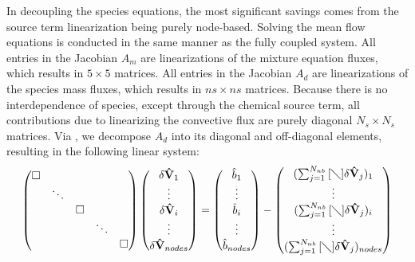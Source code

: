 In decoupling the species equations, the most significant savings comes from the
source term linearization being purely node-based\cite{gnoffo-tp}.  Solving the
mean flow equations is conducted in the same manner as the fully coupled system.
All entries in the Jacobian $A_m$ are linearizations of the mixture equation
fluxes, which results in $5\times5$ matrices. All entries in the Jacobian $A_d$
are linearizations of the species mass fluxes, which results in $ns \times ns$
matrices.  Because there is no interdependence of species, except through the
chemical source term, all contributions due to linearizing the convective flux
are purely diagonal $N_s \times N_s$ matrices.  Via , we
decompose $A_d$ into its diagonal and off-diagonal elements, resulting in the
following linear system:
\begin{equation}
  \label{dc_sys} 
  \begin{pmatrix} 
    \Box & & & & \\ & \ddots & & & \\ & & \Box \\ & & & \ddots & \\ & & & & \Box
  \end{pmatrix}
  \begin{pmatrix}
    \delta \mathbf{\hat{V}}_1 \\ \vdots \\ \delta \mathbf{\hat{V}}_i \\ 
    \vdots \\ \delta \mathbf{\hat{V}}_{nodes}
  \end{pmatrix}
  =
  \begin{pmatrix}
    \hat{b}_1 \\ \vdots \\ \hat{b}_i \\ \vdots \\ \hat{b}_{nodes} 
  \end{pmatrix}
  -
  \begin{pmatrix}
    (\sum_{j=1}^{N_{nb}}{[\diagdown] \delta\mathbf{\hat{V}}_{j}})_1 \\ \vdots \\
    (\sum_{j=1}^{N_{nb}}{[\diagdown] \delta\mathbf{\hat{V}}_{j}})_i \\ \vdots \\
    (\sum_{j=1}^{N_{nb}}{[\diagdown] \delta\mathbf{\hat{V}}_{j}})_{nodes}
  \end{pmatrix} 
\end{equation} 
